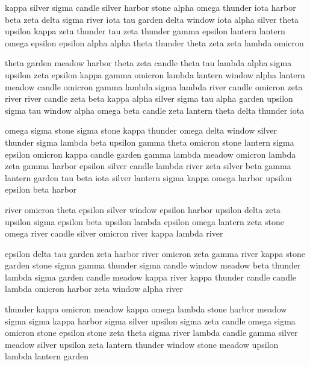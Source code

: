 \documentclass{article}
\begin{document}
\begin{center}
kappa silver sigma candle silver harbor stone alpha omega thunder iota harbor beta zeta delta sigma river iota tau garden delta window iota alpha silver theta upsilon kappa zeta thunder tau zeta thunder gamma epsilon lantern lantern omega epsilon epsilon alpha alpha theta thunder theta zeta zeta lambda omicron
\end{center}

\begin{center}
theta garden meadow harbor theta zeta candle theta tau lambda alpha sigma upsilon zeta epsilon kappa gamma omicron lambda lantern window alpha lantern meadow candle omicron gamma lambda sigma lambda river candle omicron zeta river river candle zeta beta kappa alpha silver sigma tau alpha garden upsilon sigma tau window alpha omega beta candle zeta lantern theta delta thunder iota
\end{center}

\begin{center}
omega sigma stone sigma stone kappa thunder omega delta window silver thunder sigma lambda beta upsilon gamma theta omicron stone lantern sigma epsilon omicron kappa candle garden gamma lambda meadow omicron lambda zeta gamma harbor epsilon silver candle lambda river zeta silver beta gamma lantern garden tau beta iota silver lantern sigma kappa omega harbor upsilon epsilon beta harbor
\end{center}

\begin{center}
river omicron theta epsilon silver window epsilon harbor upsilon delta zeta upsilon sigma epsilon beta upsilon lambda epsilon omega lantern zeta stone omega river candle silver omicron river kappa lambda river
\end{center}

\begin{center}
epsilon delta tau garden zeta harbor river omicron zeta gamma river kappa stone garden stone sigma gamma thunder sigma candle window meadow beta thunder lambda sigma garden candle meadow kappa river kappa thunder candle candle lambda omicron harbor zeta window alpha river
\end{center}

\begin{center}
thunder kappa omicron meadow kappa omega lambda stone harbor meadow sigma sigma kappa harbor sigma silver upsilon sigma zeta candle omega sigma omicron stone epsilon stone zeta theta sigma river lambda candle gamma silver meadow silver upsilon zeta lantern thunder window stone meadow upsilon lambda lantern garden
\end{center}
\end{document}
